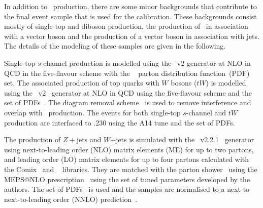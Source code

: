 \documentclass[letterpaper,12pt]{article}
\begin{document}
In addition to \ttbar\ production, there are some minor backgrounds
that contribute to the final event sample that is used for the calibration.
These backgrounds consist mostly of single-top and diboson production, 
the production of \ttbar\ in association with a vector boson
and the production of a vector boson in association with jets.
The details
of the modeling of these samples are given in the following.

Single-top $s$-channel production is modelled using the \powhegbox~v2 %
generator at NLO in QCD in the five-flavour scheme with the \nnpdfnlo~\cite{Ball:2014uwa} parton distribution function~(PDF) set.
%
The associated production of top quarks with $W$ bosons ($tW$) is
modelled using the
\powhegbox~v2~\cite{Re:2010bp,Nason:2004rx,Frixione:2007vw,Alioli:2010xd}
generator at NLO in QCD using the five-flavour scheme and the
\nnpdfnlo set of PDFs~\cite{Ball:2014uwa}.
The diagram removal scheme~\cite{Frixione:2008yi} is used to
remove interference and overlap with \ttbar\ production. 
The events for both single-top $s$-channel and $tW$ production 
are interfaced to \pythia.230%
using the A14 tune%
and the \nnpdftwo set of PDFs. %

The production of $Z+$jets and $W$+jets is simulated with the
\sherpa~v2.2.1~\cite{Bothmann:2019yzt}
generator using next-to-leading order (NLO) matrix elements (ME) for up to two partons, and leading order (LO) matrix elements
for up to four partons calculated with the Comix~\cite{Gleisberg:2008fv}
and \openloops~\cite{Buccioni:2019sur,Cascioli:2011va,Denner:2016kdg} libraries. They
are matched with the \sherpa parton shower~\cite{Schumann:2007mg} using the MEPS@NLO
prescription~\cite{Hoeche:2011fd,Hoeche:2012yf,Catani:2001cc,Hoeche:2009rj}
using the set of tuned parameters developed by the \sherpa authors.
The \nnpdfnnlo set of PDFs~\cite{Ball:2014uwa} is used and the samples
are normalised to a next-to-next-to-leading order (NNLO)
prediction~\cite{Anastasiou:2003ds}.
\end{document}
